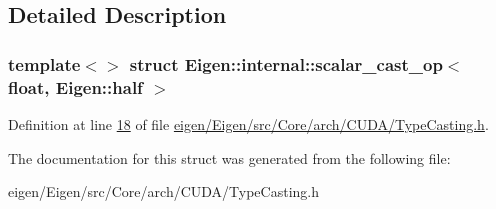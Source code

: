 \subsection{Detailed Description}
\subsubsection*{template$<$$>$\newline
struct Eigen\+::internal\+::scalar\+\_\+cast\+\_\+op$<$ float, Eigen\+::half $>$}



Definition at line \hyperlink{eigen_2_eigen_2src_2_core_2arch_2_c_u_d_a_2_type_casting_8h_source_l00018}{18} of file \hyperlink{eigen_2_eigen_2src_2_core_2arch_2_c_u_d_a_2_type_casting_8h_source}{eigen/\+Eigen/src/\+Core/arch/\+C\+U\+D\+A/\+Type\+Casting.\+h}.



The documentation for this struct was generated from the following file\+:\begin{DoxyCompactItemize}
\item 
eigen/\+Eigen/src/\+Core/arch/\+C\+U\+D\+A/\+Type\+Casting.\+h\end{DoxyCompactItemize}
